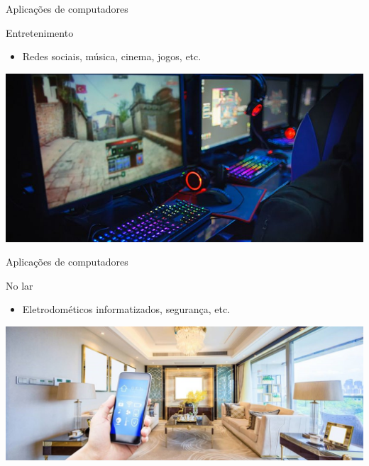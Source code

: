 \begin{frame}{Aplicações de computadores}
	\begin{block}{Entretenimento}
		\begin{itemize}
			\item Redes sociais, música, cinema, jogos, etc.
		\end{itemize}
	\end{block}

	\bigskip

	\centering
	\includegraphics[width=1\linewidth]{Figuras/Ch01/fig12}
\end{frame}


\begin{frame}{Aplicações de computadores}
	\begin{block}{No lar}
		\begin{itemize}
			\item Eletrodométicos informatizados, segurança, etc.
		\end{itemize}
	\end{block}

	\bigskip

	\centering
	\includegraphics[width=1\linewidth]{Figuras/Ch01/fig13}
\end{frame}


